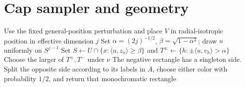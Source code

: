 \section{Cap sampler and geometry}\label{app:capprocedures}
\begin{algorithm}[H]
\caption{Cap sampler from a strict template}\label{alg:caps}
Use the fixed general-position perturbation and place $V$ in radial-isotropic position in effective dimension $j$\;
Set $\alpha=(2j)^{-1/2}$, $\beta=\sqrt{1-\alpha^2}$; draw $u$ uniformly on $S^{j-1}$\;
Set $S\gets U\cap\{x:\langle u,z_x\rangle\ge\beta\}$ and $T^\pm\gets\{h:\pm\langle u,v_h\rangle>\alpha\}$\;
Choose the larger of $T^+,T^-$ under $\nu$\;
The negative rectangle has a singleton side. Split the opposite side according to its labels in $A$, choose either color with probability $1/2$, and return that monochromatic rectangle\;
\end{algorithm}

